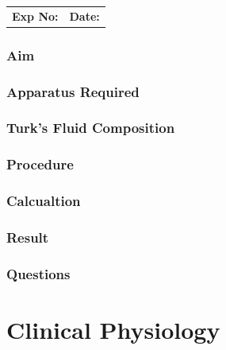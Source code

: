 \documentclass[a4paper,12pt]{book}
\begin{document}
		\begin{tabular}{p{5in} p{1in}}
			\textbf{Exp No:}  & \textbf{Date:}\\
		\end{tabular}

	\section*{Aim}
	\section*{Apparatus Required}
	\section*{Turk's Fluid Composition}
	\section*{Procedure}
	\section*{Calcualtion}
	\section*{Result}
	\section*{Questions}


\part{Clinical Physiology}
\end{document}
